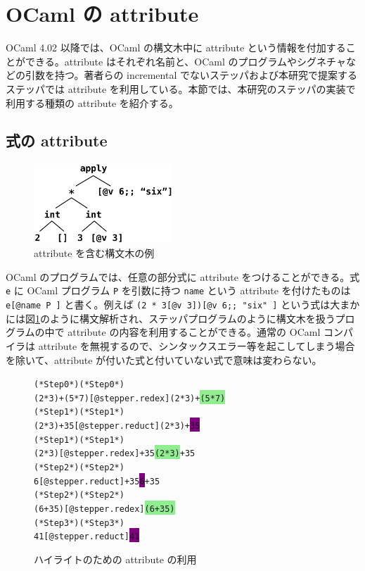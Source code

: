 \section{OCaml の attribute}
\label{OCamlのattribute}
OCaml 4.02 以降では、OCaml の構文木中に attribute という情報を付加することができる。attribute はそれぞれ名前と、OCaml のプログラムやシグネチャなどの引数を持つ。著者らの incremental でないステッパ\cite{FSA18}および本研究で提案するステッパでは attribute を利用している。本節では、本研究のステッパの実装で利用する種類の attribute を紹介する。

\subsection{式の attribute}
\label{OCamlのattribute-式のattribute}

\begin{figure}
  \begin{center}
    \includegraphics[width=5.2cm, height=3cm]{5/attribute.png}
  \end{center}
  \caption{attribute を含む構文木の例}
  \label{figure:attribute}
\end{figure}

OCaml のプログラムでは、任意の部分式に attribute をつけることができる。式 \texttt{e} に OCaml プログラム \texttt{P} を引数に持つ \texttt{name} という attribute を付けたものは \texttt{e[@name P ]} と書く。例えば \texttt{(2 * 3[@v 3])[@v 6;; "six" ]} という式は大まかには図\ref{figure:attribute}のように構文解析され、ステッパプログラムのように構文木を扱うプログラムの中で attribute の内容を利用することができる。通常の OCaml コンパイラは attribute を無視するので、シンタックスエラー等を起こしてしまう場合を除いて、attribute が付いた式と付いていない式で意味は変わらない。

\begin{figure}
\begin{alltt}
  (* Step 0 *)                              (* Step 0 *)
  (2 * 3) + (5 * 7)[@stepper.redex ]        (2 * 3) + \colorbox{lightgreen}{(5 * 7)}
  (* Step 1 *)                              (* Step 1 *)
  (2 * 3) + 35[@stepper.reduct ]            (2 * 3) + \colorbox{purple}{35}
  (* Step 1 *)                              (* Step 1 *)
  (2 * 3)[@stepper.redex ] + 35             \colorbox{lightgreen}{(2 * 3)} + 35
  (* Step 2 *)                              (* Step 2 *)
  6[@stepper.reduct ] + 35                  \colorbox{purple}{6} + 35
  (* Step 2 *)                              (* Step 2 *)
  (6 + 35)[@stepper.redex ]                 \colorbox{lightgreen}{(6 + 35)}
  (* Step 3 *)                              (* Step 3 *)
  41[@stepper.reduct ]                      \colorbox{purple}{41}
\end{alltt}
\caption{ハイライトのための attribute の利用}
\label{figure:highlight}
\end{figure}


